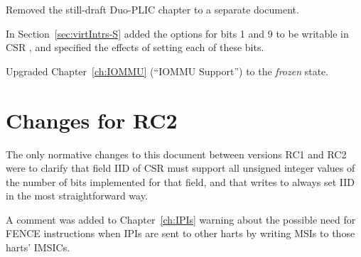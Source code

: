 Removed the still-draft Duo-PLIC chapter to a separate document.

In Section~\ref{sec:virtIntrs-S} added the options
for bits 1 and 9 to be writable in CSR ,
and specified the effects of setting each of these bits.

Upgraded Chapter~\ref{ch:IOMMU} (``IOMMU Support'')
to the \emph{frozen} state.

\section*{Changes for RC2}

The only normative changes to this document
between versions RC1 and RC2 were to clarify that
field IID of CSR  must support all
unsigned integer values of the number of bits implemented
for that field, and that writes to 
always set IID in the most straightforward way.

A comment was added to Chapter~\ref{ch:IPIs} warning about
the possible need for FENCE instructions when IPIs are
sent to other harts by writing MSIs to those harts' IMSICs.

